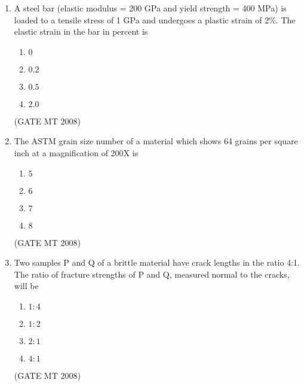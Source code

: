 \documentclass[11pt, letterpaper]{article}
\theoremstyle{remark}
\begin{document}
\begin{enumerate}[label=Q.\arabic*]
\item A steel bar (elastic modulus = 200 GPa and yield strength = 400 MPa) is loaded to a tensile stress of 1 GPa and undergoes a plastic strain of 2\%. The elastic strain in the bar in percent is
\vspace{-0.9em}
\begin{multicols}{4}
 \begin{enumerate}[label=(\MakeUppercase{\alph*})]
  \item $0$
  \item $0.2$
  \item $0.5$
  \item $2.0$
 \end{enumerate}
\end{multicols}
\vspace{-5mm}
\hfill(GATE MT 2008)

\newpage

\item The ASTM grain size number of a material which shows 64 grains per square inch at a magnification of 200X is
\vspace{-0.9em}
\begin{multicols}{4}
 \begin{enumerate}[label=(\MakeUppercase{\alph*})]
  \item $5$
  \item $6$
  \item $7$
  \item $8$
 \end{enumerate}
\end{multicols}
\vspace{-5mm}
\hfill(GATE MT 2008)

\item Two samples P and Q of a brittle material have crack lengths in the ratio 4:1. The ratio of fracture strengths of P and Q, measured normal to the cracks, will be \vspace{-0.9em}
\begin{multicols}{4}
 \begin{enumerate}[label=(\MakeUppercase{\alph*})]
  \item $1:4$
  \item $1:2$
  \item $2:1$
  \item $4:1$
 \end{enumerate}
\end{multicols}
\vspace{-5mm} 
\hfill(GATE MT 2008)


\end{enumerate}
\end{document}
